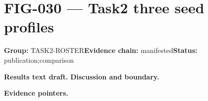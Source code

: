 \clearpage
\section{FIG-030 --- Task2 three seed profiles}
\label{figpage:fig-030}
\textbf{Group:} TASK2-ROSTER\quad \textbf{Evidence chain:} manifested\quad \textbf{Status:} publication;comparison

\textbf{Results text draft.} 
\textbf{Discussion and boundary.} 


\textbf{Evidence pointers.}



\vfill

